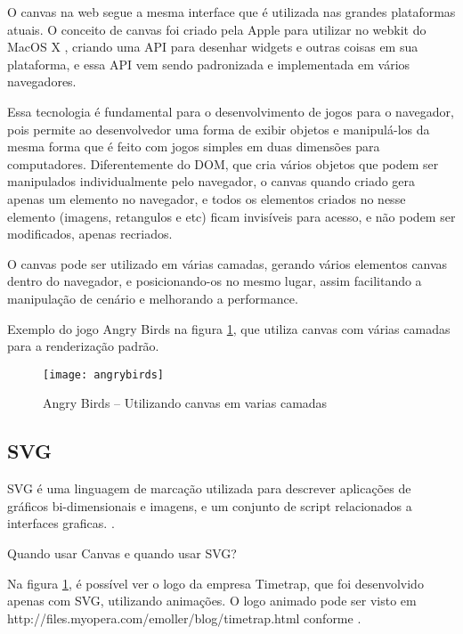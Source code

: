 O canvas na web segue a mesma interface que é utilizada nas grandes
plataformas atuais. O conceito de canvas foi criado pela Apple para
utilizar no webkit do MacOS X \cite{lubbers2010pro}, criando uma API
para desenhar widgets e outras coisas em sua plataforma, e essa API
vem sendo padronizada e implementada em vários navegadores.

Essa tecnologia é fundamental para o desenvolvimento de jogos para
o navegador, pois permite ao desenvolvedor uma forma de exibir
objetos e manipulá-los da mesma forma que é feito com jogos
simples em duas dimensões para computadores.
Diferentemente do DOM, que cria vários objetos que podem ser
manipulados individualmente pelo navegador, o canvas quando criado
gera apenas um elemento no navegador, e todos os elementos criados
no nesse elemento (imagens, retangulos e etc) ficam invisíveis para acesso, e
não podem ser modificados, apenas recriados.

O canvas pode ser utilizado em várias camadas, gerando vários
elementos canvas dentro do navegador, e posicionando-os no mesmo
lugar, assim facilitando a manipulação de cenário e melhorando a
performance.

Exemplo do jogo Angry Birds na figura \ref{img:angrybirds}, que
utiliza canvas com várias camadas para a renderização padrão.

\newlength{\imgwidth}
\setlength{\imgwidth}{16.09cm}
\newlength{\imgheight}
\setlength{\imgheight}{10.59cm}

\begin{figure}[H]
  \centering
	\texttt{[image: angrybirds]}
  \caption{Angry Birds {--} Utilizando canvas em varias camadas}
  \label{img:angrybirds}
\end{figure}

\clearpage


\subsection{SVG}

SVG é uma linguagem de marcação utilizada para descrever aplicações de gráficos
bi-dimensionais e imagens, e um conjunto de script relacionados a
interfaces graficas. \cite{w3csvg}.

Quando usar Canvas e quando usar SVG?

Na figura \ref{img:angrybirds}, é possível ver o logo da empresa
Timetrap, que foi desenvolvido apenas com SVG, utilizando animações. O
logo animado pode ser visto em
http://files.myopera.com/emoller/blog/timetrap.html conforme \cite{svgtimetrap}.

